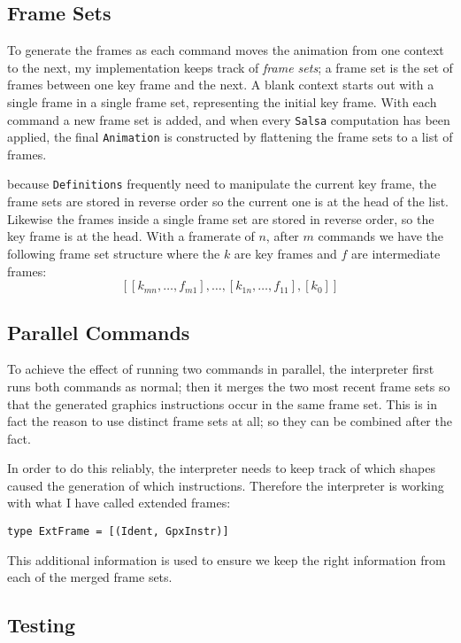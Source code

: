 \documentclass[
paper=a4,
oneside,
fontsize=11pt,
numbers=noenddot,
headinclude=false, %
footinclude=false, %
fleqn,             %
DIV=8
]{scrartcl}
\begin{document}
\subsection{Frame Sets}
\label{sec:frame-sets}

To generate the frames as each command moves the animation from one context to
the next, my implementation keeps track of {\em frame sets}; a frame set is the
set of frames between one key frame and the next. A blank context starts out
with a single frame in a single frame set, representing the initial key
frame. With each command a new frame set is added, and when every {\tt Salsa}
computation has been applied, the final {\tt Animation} is constructed by
flattening the frame sets to a list of frames.

because {\tt Definitions} frequently need to manipulate the current key frame,
the frame sets are stored in reverse order so the current one is at the head of
the list. Likewise the frames inside a single frame set are stored in reverse
order, so the key frame is at the head. With a framerate of $n$, after $m$
commands we have the following frame set structure where the $k$ are key frames
and $f$ are intermediate frames:
\[
[[k_{mn},\ldots,f_{m1}], \ldots, [k_{1n},\ldots,f_{11}], [k_0]]
\]

\subsection{Parallel Commands}

To achieve the effect of running two commands in parallel, the interpreter first
runs both commands as normal; then it merges the two most recent frame sets so
that the generated graphics instructions occur in the same frame set. This is in
fact the reason to use distinct frame sets at all; so they can be combined after
the fact.

In order to do this reliably, the interpreter needs to keep track of which
shapes caused the generation of which instructions. Therefore the interpreter is
working with what I have called extended frames:
\begin{lstlisting}
type ExtFrame = [(Ident, GpxInstr)]
\end{lstlisting}
This additional information is used to ensure we keep the right information from
each of the merged frame sets.

\subsection{Testing}
\label{sec:testing-1}
\end{document}
